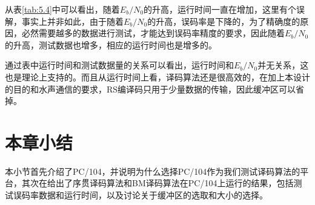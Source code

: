 从表\ref{tab:5.4}中可以看出，随着$E_b/N_0$的升高，运行时间一直在增加，这里有个误解，事实上并非如此，由于随着$E_b/N_0$的升高，误码率是下降的，为了精确度的原因，必然需要越多的数据进行测试，才能达到误码率精度的要求，因此随着$E_b/N_0$的升高，测试数据也增多，相应的运行时间也是增多的。

通过表中运行时间和测试数据量的关系可以看出，运行时间和$E_b/N_0$并无关系，这也是理论上支持的。而且从运行时间上看，译码算法还是很高效的，在加上本设计的目的和水声通信的要求，RS编译码只用于少量数据的传输，因此缓冲区可以省掉。
\section{本章小结}
本小节首先介绍了PC/104，并说明为什么选择PC/104作为我们测试译码算法的平台，其次在给出了序贯译码算法和BM译码算法在PC/104上运行的结果，包括测试误码率数据和运行时间，以及讨论关于缓冲区的选取和大小的选择。
%
